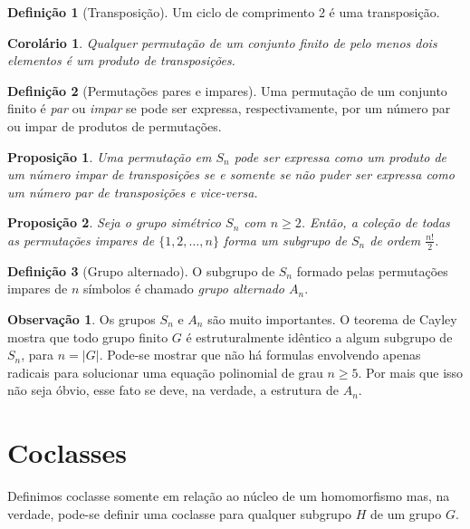 \documentclass[a4paper,12pt]{report}
\theoremstyle{plain}
\newtheorem{proposicao}{Proposição}[section]
\newtheorem{corolario}{Corolário}[section]
\theoremstyle{definition}
\newtheorem{definicao}{Definição}[section]
\newtheorem{observacao}{Observação}[section]
\begin{document}
\begin{definicao}[Transposição]
	Um ciclo de comprimento 2 é uma transposição.
\end{definicao}

\begin{corolario}
	Qualquer permutação de um conjunto finito de pelo menos dois elementos é um produto de transposições.	
\end{corolario}

\begin{definicao}[Permutações pares e impares]
	Uma permutação de um conjunto finito é \emph{par} ou \emph{impar} se pode ser expressa, respectivamente, por um número par ou impar de produtos de permutações.
\end{definicao}

\begin{proposicao}
	Uma permutação em $S_n$ pode ser expressa como um produto de um número impar de transposições se e somente se não puder ser expressa como um número par de transposições e vice-versa.
\end{proposicao}

\begin{proposicao}
	Seja o grupo simétrico $S_n$ com $n\geq 2$. Então, a coleção de todas as permutações impares de $\{1,2,\dots,n\}$ forma um subgrupo de $S_n$ de ordem $\frac{n!}{2}$.	
\end{proposicao}

\begin{definicao}[Grupo alternado]
	O subgrupo de $S_n$ formado pelas permutações impares de $n$ símbolos é chamado \emph{grupo alternado $A_n$}.
\end{definicao}

\begin{observacao}
	Os grupos $S_n$ e $A_n$ são muito importantes. O teorema de Cayley mostra que todo grupo finito $G$ é estruturalmente idêntico a algum subgrupo de $S_n$, para $n = |G|$. Pode-se mostrar que não há formulas envolvendo apenas radicais para solucionar uma equação polinomial de grau $n\geq 5$. Por mais que isso não seja óbvio, esse fato se deve, na verdade, a estrutura de $A_n$.
\end{observacao}


\section{Coclasses}

Definimos coclasse somente em relação ao núcleo de um homomorfismo mas,
na verdade, pode-se definir uma coclasse para qualquer subgrupo \(H\) de
um grupo \(G\).
\end{document}
